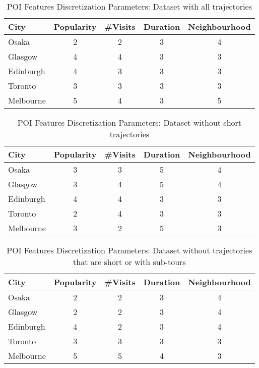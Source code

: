 \begin{table}
\centering
\caption{POI Features Discretization Parameters: Dataset with all trajectories}
\label{table:discretize:all}
\scriptsize
\begin{tabular}{lcccc} \hline
\textbf{City} & \textbf{Popularity} & \textbf{\#Visits} & \textbf{Duration} & \textbf{Neighbourhood} \\ \hline
Osaka & 2 & 2 & 3 & 4 \\ 
Glasgow & 4 & 4 & 3 & 3 \\ 
Edinburgh & 4 & 3 & 3 & 3 \\ 
Toronto & 3 & 3 & 3 & 3 \\ 
Melbourne & 5 & 4 & 3 & 5 \\ 
\hline
\end{tabular}
\end{table}

\begin{table}
\centering
\caption{POI Features Discretization Parameters: Dataset without short trajectories}
\label{table:discretize:noshort}
\scriptsize
\begin{tabular}{lcccc} \hline
\textbf{City} & \textbf{Popularity} & \textbf{\#Visits} & \textbf{Duration} & \textbf{Neighbourhood} \\ \hline
Osaka & 3 & 3 & 5 & 4 \\ 
Glasgow & 3 & 4 & 5 & 4 \\ 
Edinburgh & 4 & 4 & 3 & 3 \\ 
Toronto & 2 & 4 & 3 & 3 \\ 
Melbourne & 3 & 2 & 5 & 3 \\ 
\hline
\end{tabular}
\end{table}

\begin{table}
\centering
\caption{POI Features Discretization Parameters: Dataset without trajectories that are short or with sub-tours}
\label{table:discretize:perfect}
\scriptsize
\begin{tabular}{lcccc} \hline
\textbf{City} & \textbf{Popularity} & \textbf{\#Visits} & \textbf{Duration} & \textbf{Neighbourhood} \\ \hline
Osaka & 2 & 2 & 3 & 4 \\ 
Glasgow & 2 & 2 & 3 & 4 \\ 
Edinburgh & 4 & 2 & 3 & 4 \\ 
Toronto & 3 & 3 & 3 & 3 \\ 
Melbourne & 5 & 5 & 4 & 3 \\ 
\hline
\end{tabular}
\end{table}


